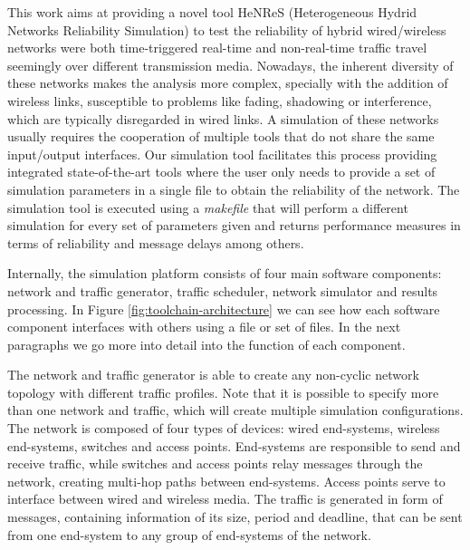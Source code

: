 \documentclass[conference]{IEEEtran}
\begin{document}

This work aims at providing a novel tool HeNReS (Heterogeneous Hydrid Networks Reliability Simulation) to test the reliability of hybrid wired/wireless networks were both time-triggered real-time and non-real-time traffic travel seemingly over different transmission media. Nowadays, the inherent diversity of these networks makes the analysis more complex, specially with the addition of wireless links, susceptible to problems like fading, shadowing or interference, which are typically disregarded in wired links. A simulation of these networks usually requires the cooperation of multiple tools that do not share the same input/output interfaces. Our simulation tool facilitates this process providing integrated state-of-the-art tools where the user only needs to provide a set of simulation parameters in a single file to obtain the reliability of the network. The simulation tool is executed using a \textit{makefile} that will perform a different simulation for every set of parameters given and returns performance measures in terms of reliability and message delays among others.




Internally, the simulation platform consists of four main software components: network and traffic generator, traffic scheduler, network simulator and results processing. In Figure \ref{fig:toolchain-architecture} we can see how each software component interfaces with others using a file or set of files. In the next paragraphs we go more into detail into the function of each component.

The network and traffic generator is able to create any non-cyclic network topology with different traffic profiles. Note that it is possible to specify more than one network and traffic, which will create multiple simulation configurations. The network is composed of four types of devices: wired end-systems, wireless end-systems, switches and access points. End-systems are responsible to send and receive traffic, while switches and access points relay messages through the network, creating multi-hop paths between end-systems. Access points serve to interface between wired and wireless media. The traffic is generated in form of messages, containing information of its size, period and deadline, that can be sent from one end-system to any group of end-systems of the network.
\end{document}
